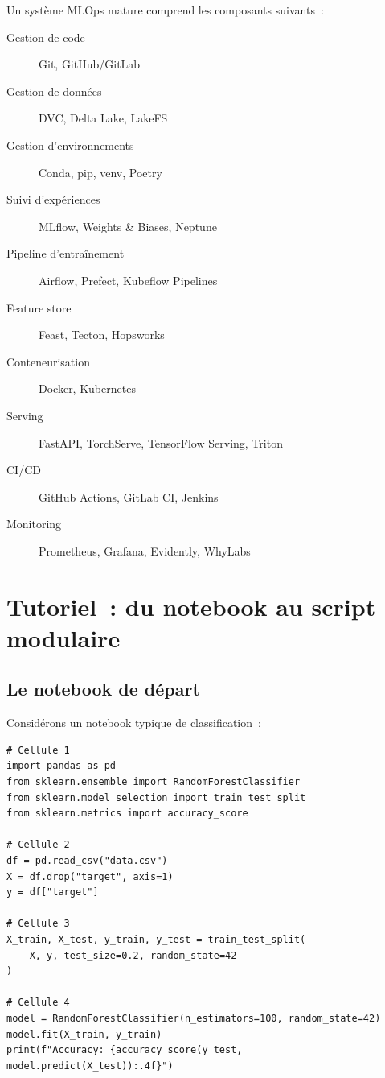 Un syst\`eme MLOps mature comprend les composants suivants~:

\begin{toolbox}[title=\textbf{Composants d'un syst\`eme MLOps}]
\begin{description}
  \item[Gestion de code] Git, GitHub/GitLab
  \item[Gestion de donn\'ees] DVC, Delta Lake, LakeFS
  \item[Gestion d'environnements] Conda, pip, venv, Poetry
  \item[Suivi d'exp\'eriences] MLflow, Weights \& Biases, Neptune
  \item[Pipeline d'entra\^inement] Airflow, Prefect, Kubeflow Pipelines
  \item[Feature store] Feast, Tecton, Hopsworks
  \item[Conteneurisation] Docker, Kubernetes
  \item[Serving] FastAPI, TorchServe, TensorFlow Serving, Triton
  \item[CI/CD] GitHub Actions, GitLab CI, Jenkins
  \item[Monitoring] Prometheus, Grafana, Evidently, WhyLabs
\end{description}
\end{toolbox}

\section{Tutoriel~: du notebook au script modulaire}
\label{sec:notebook-to-script}

\subsection{Le notebook de d\'epart}

Consid\'erons un notebook typique de classification~:

\begin{codeblock}[title=\textbf{Notebook typique (anti-pattern)}]
\begin{verbatim}
# Cellule 1
import pandas as pd
from sklearn.ensemble import RandomForestClassifier
from sklearn.model_selection import train_test_split
from sklearn.metrics import accuracy_score

# Cellule 2
df = pd.read_csv("data.csv")
X = df.drop("target", axis=1)
y = df["target"]

# Cellule 3
X_train, X_test, y_train, y_test = train_test_split(
    X, y, test_size=0.2, random_state=42
)

# Cellule 4
model = RandomForestClassifier(n_estimators=100, random_state=42)
model.fit(X_train, y_train)
print(f"Accuracy: {accuracy_score(y_test, model.predict(X_test)):.4f}")
\end{verbatim}
\end{codeblock}

